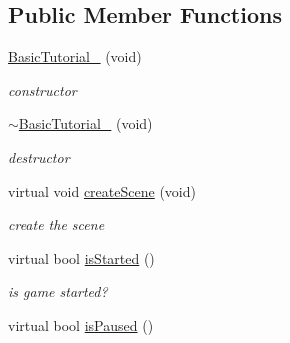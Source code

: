 \subsection*{Public Member Functions}
\begin{DoxyCompactItemize}
\item 
\hyperlink{class_basic_tutorial__00_a6b55068822076b28e7819b1878e95684}{Basic\+Tutorial\+\_} (void)\hypertarget{class_basic_tutorial__00_a6b55068822076b28e7819b1878e95684}{}\label{class_basic_tutorial__00_a6b55068822076b28e7819b1878e95684}

\begin{DoxyCompactList}\small\item\em constructor \end{DoxyCompactList}\item 
\hyperlink{class_basic_tutorial__00_a9df0243c6c09c5e3d182dc242b90a90b}{$\sim$\+Basic\+Tutorial\+\_} (void)\hypertarget{class_basic_tutorial__00_a9df0243c6c09c5e3d182dc242b90a90b}{}\label{class_basic_tutorial__00_a9df0243c6c09c5e3d182dc242b90a90b}

\begin{DoxyCompactList}\small\item\em destructor \end{DoxyCompactList}\item 
virtual void \hyperlink{class_basic_tutorial__00_a15a3d4673724ec99077ce992f996a550}{create\+Scene} (void)\hypertarget{class_basic_tutorial__00_a15a3d4673724ec99077ce992f996a550}{}\label{class_basic_tutorial__00_a15a3d4673724ec99077ce992f996a550}

\begin{DoxyCompactList}\small\item\em create the scene \end{DoxyCompactList}\item 
virtual bool \hyperlink{class_basic_tutorial__00_a74d6b3b32ddf53aeb178540617b86045}{is\+Started} ()\hypertarget{class_basic_tutorial__00_a74d6b3b32ddf53aeb178540617b86045}{}\label{class_basic_tutorial__00_a74d6b3b32ddf53aeb178540617b86045}

\begin{DoxyCompactList}\small\item\em is game started? \end{DoxyCompactList}\item 
virtual bool \hyperlink{class_basic_tutorial__00_a58ef600ec65f7f04dc5520b9b9185f5b}{is\+Paused} ()\hypertarget{class_basic_tutorial__00_a58ef600ec65f7f04dc5520b9b9185f5b}{}\label{class_basic_tutorial__00_a58ef600ec65f7f04dc5520b9b9185f5b}


\end{DoxyCompactItemize}
